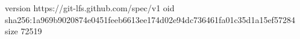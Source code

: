version https://git-lfs.github.com/spec/v1
oid sha256:1a969b9020874e0451feeb6613ee174d02e94dc736461fa01c35d1a15ef57284
size 72519
